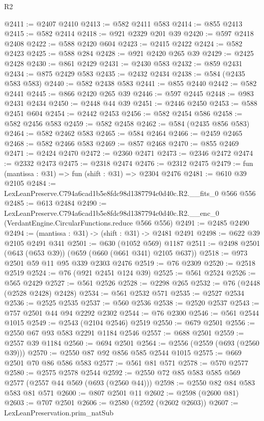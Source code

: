 \begin{lexlean}{R2}
\begin{coremodule}
@2411 := @2407 @2410
@2413 := @582 @2411 @583
@2414 := @855 @2413
@2415 := @582 @2414
@2418 := @921 @2329 @201 @39
@2420 := @597 @2418 @2408
@2422 := @588 @2420 @604
@2423 := @2415 @2422
@2424 := @582 @2423
@2425 := @588 @284
@2428 := @921 @2420 @265 @39
@2429 := @2425 @2428
@2430 := @861 @2429
@2431 := @2430 @583
@2432 := @859 @2431
@2434 := @875 @2429 @583
@2435 := @2432 @2434
@2438 := @584 (@2435 @583 @583)
@2440 := @582 @2438 @583
@2441 := @855 @2440
@2442 := @582 @2441
@2445 := @866 @2420 @265 @39
@2446 := @597 @2445
@2448 := @983 @2431 @2434
@2450 := @2448 @44 @39
@2451 := @2446 @2450
@2453 := @588 @2451 @604
@2454 := @2442 @2453
@2456 := @582 @2454 @586
@2458 := @582 @2456 @583
@2459 := @582 @2458
@2462 := @584 (@2435 @856 @583)
@2464 := @582 @2462 @583
@2465 := @584 @2464
@2466 := @2459 @2465
@2468 := @582 @2466 @583
@2469 := @857 @2468
@2470 := @855 @2469
@2471 := @2424 @2470
@2472 := @2360 @2471
@2473 := @2346 @2472
@2474 := @2332 @2473
@2475 := @2318 @2474
@2476 := @2312 @2475
@2479 := fun (mantissa : @31) => fun (shift : @31) => @2304 @2476
@2481 := @610 @39 @2105
@2484 := LexLeanPreserve.C794a6cad1b5e8fdc98d1387794c0d40c.R2.__fits_0 @566 @556
@2485 := @613 @2484
@2490 := LexLeanPreserve.C794a6cad1b5e8fdc98d1387794c0d40c.R2.__enc_0
    (VerdantEngine.CircularFunctions.reduce @566 @556)
@2491 := @2485 @2490
@2494 := (mantissa : @31) -> (shift : @31) -> @2481 @2491
@2498 := @622 @39 @2105 @2491 @341
@2501 := @630 (@1052 @569) @1187
@2511 := @2498 @2501 (@643 (@653 @39)) (@659 (@660 (@661 @341) @2105 @637))
@2518 := @973 @2501 @59 @11 @95 @339 @2303 @2476
@2519 := @76 @2309
@2520 := @2518 @2519
@2524 := @76 (@921 @2451 @124 @39)
@2525 := @561 @2524
@2526 := @565 @2429
@2527 := @561 @2526
@2528 := @2298 @265
@2532 := @76 (@2448 (@2528 @2428) @2428)
@2534 := @561 @2532 @571
@2535 := @2527 @2534
@2536 := @2525 @2535
@2537 := @560 @2536
@2538 := @2520 @2537
@2543 := @757 @2501 @44 @94 @2292 @2302
@2544 := @76 @2300
@2546 := @561 @2544 @1015
@2549 := @2543 (@2104 @2546) @2519
@2550 := @679 @2501
@2556 := @2550 @67 @93 @583 @2291 @1184 @2546
@2557 := @688 @2501
@2559 := @2557 @39 @1184
@2560 := @694 @2501
@2564 := @2556 (@2559 (@693 (@2560 @39)))
@2570 := @2550 @87 @92 @856 @585 @2544 @1015
@2575 := @669 @2501 @70 @86 @586 @583
@2577 := @561 @81 @571
@2578 := @570 @2577
@2580 := @2575 @2578 @2544
@2592 := @2550 @72 @85 @583 @585 @569 @2577 (@2557 @44 @569 (@693 (@2560 @44)))
@2598 := @2550 @82 @84 @583 @583 @81 @571
@2600 := @807 @2501 @11
@2602 := @2598 (@2600 @81)
@2603 := @707 @2501
@2606 := @2580 (@2592 (@2602 @2603))
@2607 := LexLeanPreservation.prim_natSub

\end{coremodule}
\end{lexlean}
